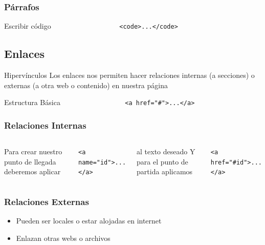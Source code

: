 \documentclass{beamer}
\begin{document}
\begin{frame}[fragile]
\frametitle{Párrafos}
	\begin{block}{Escribir código}
	\verb|                  <code>...</code>|
	\end{block}
\end{frame}
	\subsection{Enlaces}
\begin{frame}[fragile] %
	\begin{block}{Hipervínculos}
	Los enlaces nos permiten hacer relaciones internas (a secciones) o externas (a otra web o contenido) en nuestra página
	\end{block}
	
	\begin{block}{Estructura Básica}
	\verb|                 <a href="#">...</a>|	
	\end{block}
\end{frame}

\begin{frame}[fragile] %
\frametitle{Relaciones Internas}
	\begin{columns}[c]
	Para crear nuestro punto de llegada deberemos aplicar
	\newline
	
	\verb|<a name="id">...</a>|
	\newline
	
	al texto deseado
	Y para el punto de partida aplicamos
	\newline
	
	\verb|<a href="#id">...</a>|
	\end{columns}
\end{frame}

\begin{frame} %
\frametitle{Relaciones Externas}
	\begin{itemize}
	\item Pueden ser locales o estar alojadas en internet
	\item Enlazan otras webs o archivos
	\end{itemize}
\end{frame}
\end{document}
